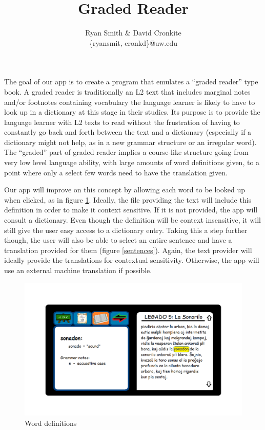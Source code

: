 \documentclass[11pt]{article}
\author{Ryan Smith \& David Cronkite \\ \{ryansmit, cronkd\}@uw.edu}
\title{Graded Reader}
\begin{document}
\maketitle

The goal of our app is to create a program that emulates a ``graded reader'' type book.  A graded reader is traditionally an L2 text that includes marginal notes and/or footnotes containing vocabulary the language learner is likely to have to look up in a dictionary at this stage in their studies. Its purpose is to provide the language learner with L2 texts to read without the frustration of having to constantly go back and forth between the text and a dictionary (especially if a dictionary might not help, as in a new grammar structure or an irregular word).  The ``graded'' part of graded reader implies a course-like structure going from very low level language ability, with large amounts of word definitions given, to a point where only a select few words need to have the translation given.

Our app will improve on this concept by allowing each word to be looked up when clicked, as in figure \ref{words}. Ideally, the file providing the text will include this definition in order to make it context sensitive. If it is not provided, the app will consult a dictionary. Even though the definition will be context insensitive, it will still give the user easy access to a dictionary entry.  Taking this a step further though, the user will also be able to select an entire sentence and have a translation provided for them (figure \ref{sentences}).  Again, the text provider will ideally provide the translations for contextual sensitivity. Otherwise, the app will use an external machine translation if possible.

\begin{figure}[h]
  \caption{Word definitions}
  \label{words}
  \includegraphics[scale=.5]{word_look_up.png}
\end{figure}
\end{document}
